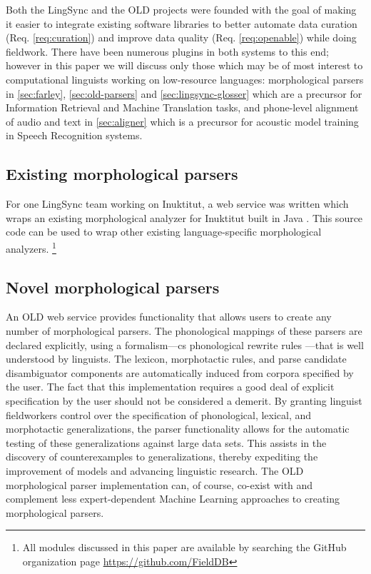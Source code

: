 \documentclass[11pt]{article}
\begin{document}
Both the LingSync and the OLD projects were founded with the goal of making it
easier to integrate existing software
libraries to better automate data curation (Req. \autoref{req:curation}) and 
improve data quality (Req. \autoref{req:openable}) while doing fieldwork. There have been numerous
plugins in both systems to this end; however in this paper we will discuss only
those which may be of most interest to computational linguists working on
low-resource languages: morphological parsers in \autoref{sec:farley}, 
\autoref{sec:old-parsers} and \autoref{sec:lingsync-glosser} which are a
precursor for Information Retrieval and Machine Translation tasks, and 
phone-level alignment of audio and text in \autoref{sec:aligner} which is a
precursor for acoustic model training in Speech Recognition systems.



\subsection{Existing morphological parsers}
\label{sec:farley}

For one LingSync team working on Inuktitut, a web service was written which
wraps an existing morphological analyzer for Inuktitut built in Java
\cite{Farley:2012:Online}. This source code can be used to wrap other existing
language-specific morphological analyzers.%
\footnote{All modules discussed in this paper are available by searching the
    GitHub organization page
\url{https://github.com/FieldDB}}


\subsection{Novel morphological parsers}
\label{sec:old-parsers}

An OLD web service provides functionality that allows users to create any
number of morphological parsers. The phonological mappings of these parsers
are declared explicitly, using a formalism---\gls{cs} phonological rewrite
rules \cite{chomsky68}---that is well understood by linguists. The lexicon,
morphotactic rules, and parse candidate disambiguator components are
automatically induced from corpora specified by the user. The fact that this
implementation requires a good deal of explicit specification by the user
should not be considered a demerit. By granting linguist fieldworkers control
over the specification of phonological, lexical, and morphotactic
generalizations, the parser functionality allows for the automatic testing of
these generalizations against large data sets. This assists in the discovery of
counterexamples to generalizations, thereby expediting the improvement of
models and advancing linguistic research. The OLD morphological parser
implementation can, of course, co-exist with and complement less
expert-dependent Machine Learning approaches to creating morphological parsers.
\end{document}
